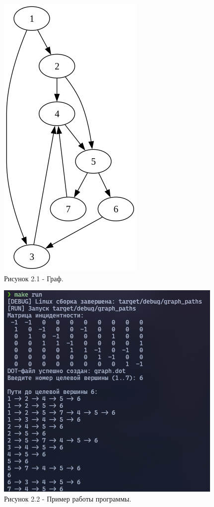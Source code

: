 \documentclass[oneside,a4paper,14pt]{extarticle}
\begin{document}
\clearpage
\begin{figure}[H]
	\centering
	\includegraphics[height=0.3\textheight]{pics/graph.png}
	\caption*{Рисунок 2.1 - Граф.}
\end{figure}

\begin{figure}[H]
	\centering
	\includegraphics[height=0.5\textheight]{pics/screen.png}
	\caption*{Рисунок 2.2 - Пример работы программы.}
\end{figure}
\end{document}

